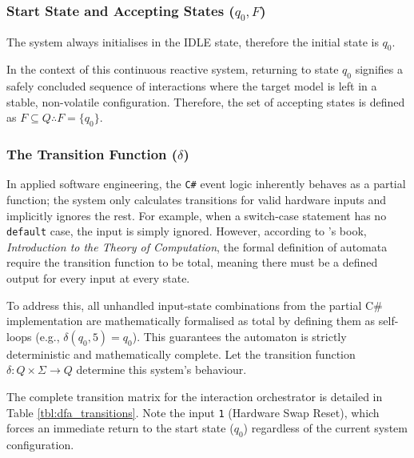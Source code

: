 \subsubsection{Start State and Accepting States ($q_0, F$)}
\label{sec:fsm_start_accept}
The system always initialises in the IDLE state, therefore the initial state is $q_0$.

In the context of this continuous reactive system, returning to state $q_0$ signifies a safely concluded sequence of interactions where the target model is left in a stable, non-volatile configuration. Therefore, the set of accepting states is defined as $F \subseteq Q \therefore F = \{q_0\}$.

\subsubsection{The Transition Function ($\delta$)}
\label{sec:fsm_delta}
In applied software engineering, the \texttt{C\#} event logic inherently behaves as a partial function; the system only calculates transitions for valid hardware inputs and implicitly ignores the rest. For example, when a switch-case statement has no \texttt{default} case, the input is simply ignored. However, according to \citeauthor{Sipser2012IntroductionComputation}'s book, \textit{Introduction to the Theory of Computation}, the formal definition of automata require the transition function to be total, meaning there must be a defined output for every input at every state. \newline

To address this, all unhandled input-state combinations from the partial C\# implementation are mathematically formalised as total by defining them as self-loops (e.g., $\delta(q_0, 5) = q_0$). This guarantees the automaton is strictly deterministic and mathematically complete. Let the transition function $\delta : Q \times \Sigma \rightarrow Q$ determine this system's behaviour. \newline

The complete transition matrix for the interaction orchestrator is detailed in Table \ref{tbl:dfa_transitions}. Note the input \texttt{1} (Hardware Swap Reset), which forces an immediate return to the start state ($q_0$) regardless of the current system configuration.

